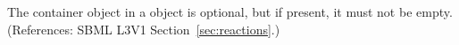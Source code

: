 The \ListOfLocalParameters container object in a \KineticLaw object is
optional, but if present, it must not be empty.  (References: SBML L3V1
Section~\ref{sec:reactions}.)
